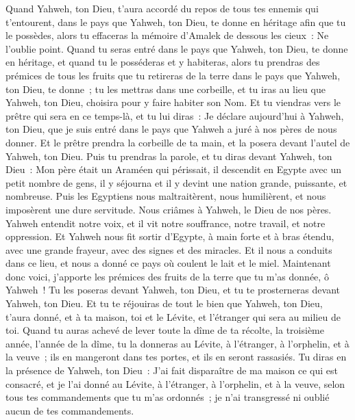 \begin{multicols}{2}
Quand Yahweh, ton Dieu, t'aura accordé du repos de tous tes ennemis qui t'entourent, dans le pays que Yahweh, ton Dieu, te donne en héritage afin que tu le possèdes, alors tu effaceras la mémoire d'Amalek de dessous les cieux~: Ne l'oublie point.
\VerseOne{}Quand tu seras entré dans le pays que Yahweh, ton Dieu, te donne en héritage, et quand tu le posséderas et y habiteras,
alors tu prendras des prémices de tous les fruits que tu retireras de la terre dans le pays que Yahweh, ton Dieu, te donne~; tu les mettras dans une corbeille, et tu iras au lieu que Yahweh, ton Dieu, choisira pour y faire habiter son Nom.
Et tu viendras vers le prêtre qui sera en ce temps-là, et tu lui diras~: Je déclare aujourd'hui à Yahweh, ton Dieu, que je suis entré dans le pays que Yahweh a juré à nos pères de nous donner.
Et le prêtre prendra la corbeille de ta main, et la posera devant l'autel de Yahweh, ton Dieu.
Puis tu prendras la parole, et tu diras devant Yahweh, ton Dieu~: Mon père était un Araméen qui périssait, il descendit en Egypte avec un petit nombre de gens, il y séjourna et il y devint une nation grande, puissante, et nombreuse.
Puis les Egyptiens nous maltraitèrent, nous humilièrent, et nous imposèrent une dure servitude.
Nous criâmes à Yahweh, le Dieu de nos pères. Yahweh entendit notre voix, et il vit notre souffrance, notre travail, et notre oppression.
Et Yahweh nous fit sortir d'Egypte, à main forte et à bras étendu, avec une grande frayeur, avec des signes et des miracles.
Et il nous a conduits dans ce lieu, et nous a donné ce pays où coulent le lait et le miel.
Maintenant donc voici, j'apporte les prémices des fruits de la terre que tu m'as donnée, ô Yahweh~! Tu les poseras devant Yahweh, ton Dieu, et tu te prosterneras devant Yahweh, ton Dieu.
Et tu te réjouiras de tout le bien que Yahweh, ton Dieu, t'aura donné, et à ta maison, toi et le Lévite, et l'étranger qui sera au milieu de toi.
Quand tu auras achevé de lever toute la dîme de ta récolte, la troisième année, l'année de la dîme, tu la donneras au Lévite, à l'étranger, à l'orphelin, et à la veuve~; ils en mangeront dans tes portes, et ils en seront rassasiés.
Tu diras en la présence de Yahweh, ton Dieu~: J'ai fait disparaître de ma maison ce qui est consacré, et je l'ai donné au Lévite, à l'étranger, à l'orphelin, et à la veuve, selon tous tes commandements que tu m'as ordonnés~; je n'ai transgressé ni oublié aucun de tes commandements.

\end{multicols}

